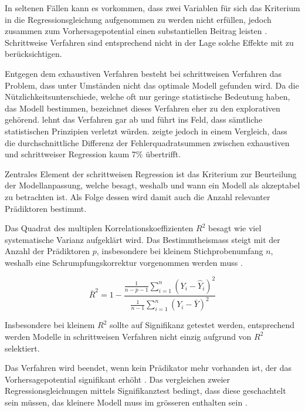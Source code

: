 \documentclass[english,12pt,doc]{apa}
\begin{document}
In seltenen Fällen kann es vorkommen, dass zwei Variablen für sich das Kriterium in die Regressionsgleichung aufgenommen zu werden nicht erfüllen, jedoch zusammen zum Vorhersagepotential einen substantiellen Beitrag leisten \cite[p.261]{jacob2003applied}. 
Schrittweise Verfahren sind entsprechend nicht in der Lage solche Effekte mit zu berücksichtigen. 

Entgegen dem exhaustiven Verfahren besteht bei schrittweisen Verfahren das Problem, dass unter Umständen nicht das optimale Modell gefunden wird. 
Da die Nützlichkeitsunterschiede, welche oft nur geringe statistische Bedeutung haben, das Modell bestimmen, bezeichnet  dieses Verfahren eher zu den explorativen gehörend. 
 lehnt das Verfahren gar ab und führt ins Feld, dass sämtliche statistischen Prinzipien verletzt würden. 
 zeigte jedoch in einem Vergleich, dass die durchschnittliche Differenz der Fehlerquadratsummen zwischen exhaustiven und schrittweiser Regression kaum 7\% übertrifft. 

Zentrales Element der schrittweisen Regression ist das Kriterium zur Beurteilung der  Modellanpassung, welche besagt, weshalb und wann ein Modell als akzeptabel zu betrachten ist. 
Als Folge dessen wird damit auch die Anzahl relevanter Prädiktoren bestimmt.


Das Quadrat des multiplen Korrelationskoeffizienten $R^2$ besagt wie viel systematische Varianz aufgeklärt wird. 
Das Bestimmtheismass steigt mit der Anzahl der Prädiktoren $p$, insbesondere bei kleinem Stichprobenumfang $n$, weshalb eine Schrumpfungskorrektur vorgenommen werden muss \cite[p. 451]{bortz2011}. 

\begin{equation}
\bar R^2=1-\frac{\displaystyle \frac{1}{n-p-1} \sum_{i=1}^n (Y_i-\hat{Y}_i)^2}{\displaystyle \frac{1}{n-1} \sum_{i=1}^n (Y_i-\bar{Y})^2}
\tag{korrigiertes Bestimmtheitsmass}
\end{equation}

Insbesondere bei kleinem $R^2$ sollte auf Signifikanz getestet werden, entsprechend werden Modelle in schrittweisen Verfahren nicht einzig aufgrund von $R^2$ selektiert. 

Das Verfahren wird beendet, wenn kein Prädikator mehr vorhanden ist, der das Vorhersagepotential signifikant erhöht \cite[p.48]{bendel1977comparison}. 
Das vergleichen zweier Regressionsgleichungen mittels Signifikanztest bedingt, dass diese geschachtelt sein müssen, das kleinere Modell muss im grösseren enthalten sein \cite[p. 508]{jacob2003applied}.
\end{document}
